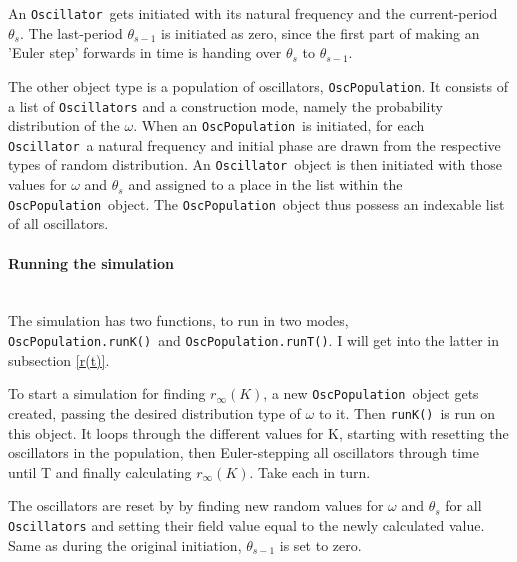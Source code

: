 \documentclass[11pt,a4paper]{article}
\newcommand{\graph}{\medskip\noindent}
\newcommand{\osc}{\texttt{Oscillator}~}
\newcommand{\oscpop}{\texttt{OscPopulation}~}
\newcommand{\runK}{\code{runK()}~}
\newcommand{\code}[1]{\texttt{#1}}
\newcommand{\para}[1]{\paragraph{#1}\mbox{}\\}
\begin{document}
An \osc gets initiated with its natural frequency and the current-period $\theta_s$. 
The last-period $\theta_{s-1}$ is initiated as zero, since the first part of making an 'Euler step' forwards in time is handing over $\theta_{s}$ to $\theta_{s-1}$. 

The other object type is a population of oscillators, \code{OscPopulation}. 
It consists of a list of \code{Oscillators} and a construction mode, namely the probability distribution of the $\omega$.
When an \oscpop is initiated, for each \osc a natural frequency and initial phase are drawn from the respective types of random distribution. 
An \osc object is then initiated with those values for $\omega$ and $\theta_s$ and assigned to a place in the list within the \oscpop object.
The \oscpop object thus possess an indexable list of all oscillators.







\para{Running the simulation}
The simulation has two functions, to run in two modes, \code{OscPopulation.runK()}~and \linebreak \code{OscPopulation.runT()}. 
I will get into the latter in subsection \ref{r(t)}.

To start a simulation for finding $r_\infty(K)$, a new \oscpop object gets created, passing the desired distribution type of $\omega$ to it.
Then \runK is run on this object.
It loops through the different values for K, starting with resetting the oscillators in the population, then Euler-stepping all oscillators through time until T and finally calculating $r_\infty(K)$. 
Take each in turn. 




\graph
The oscillators are reset by by finding new random values for $\omega$ and $\theta_s$ for all \code{Oscillators} and setting their field value equal to the newly calculated value. 
Same as during the original initiation, $\theta_{s-1}$ is set to zero.
\end{document}
